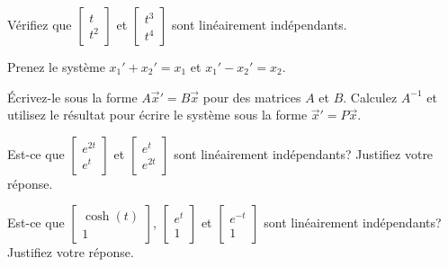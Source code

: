 \begin{exercise}
Vérifiez que
$\left[ \begin{smallmatrix}
t \\ t^2
\end{smallmatrix} \right]$ et
$\left[ \begin{smallmatrix}
t^3 \\ t^4
\end{smallmatrix} \right]$ 
sont linéairement indépendants.
\end{exercise}

\begin{exercise}
Prenez le système $x_1' + x_2' = x_1$ et
$x_1' - x_2' = x_2$.
\begin{tasks}
\task Écrivez-le sous la forme
$A {\vec{x}}' = B \vec{x}$ pour des matrices $A$ et $B$.
\task Calculez $A^{-1}$ et utilisez le résultat pour écrire le système sous la forme
${\vec{x}}' = P \vec{x}$.
\end{tasks}
\end{exercise}

\setcounter{exercise}{100}

\begin{exercise}
Est-ce que
$\left[ \begin{smallmatrix}
e^{2t} \\ e^t
\end{smallmatrix}\right]$
et
$\left[ \begin{smallmatrix}
e^{t} \\ e^{2t}
\end{smallmatrix}\right]$
sont linéairement indépendants? Justifiez votre réponse.
\end{exercise}

\begin{exercise}
Est-ce que
$\left[ \begin{smallmatrix}
\cosh(t) \\ 1
\end{smallmatrix}\right]$,
$\left[ \begin{smallmatrix}
e^{t} \\ 1
\end{smallmatrix}\right]$
et
$\left[ \begin{smallmatrix}
e^{-t} \\ 1
\end{smallmatrix}\right]$
sont linéairement indépendants? Justifiez votre réponse.
\end{exercise}

